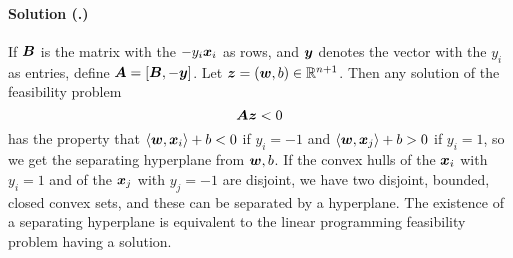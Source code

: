 \documentclass{article}
\newcounter{problemSheetNumber}
\newcounter{problems}
\renewcommand{\solution}[1]{\paragraph{Solution (\theproblemSheetNumber.\theproblems)}\addtocounter{problems}{1}\label{#1}}
\begin{document}
\solution{pr:3} If $\bm{B}$ is the matrix with the $-y_i\bm{x}_i$ as rows, and $\bm{y}$ denotes the vector with the $y_i$ as entries, define $\bm{A}=[\bm{B},-\bm{y}]$. 
Let $\bm{z}=(\bm{w},b)\in \mathbb{R}^{n+1}$. 
Then any solution of the feasibility problem
\begin{equation*}
\bm{A}\bm{z}<0
\end{equation*}
has the property that $\langle {\bm{w}}, {\bm{x}_i} \rangle+b<0$ if $y_i=-1$ and $\langle {\bm{w}}, {\bm{x}_j} \rangle+b>0$ if $y_i=1$, so we get the separating hyperplane from $\bm{w},b$. If the convex hulls of the $\bm{x}_i$ with $y_i=1$ and of the $\bm{x}_j$ with $y_j=-1$ are disjoint, we have two disjoint, bounded, closed convex sets, and these can be separated by a hyperplane. The existence of a separating hyperplane is equivalent to the linear programming feasibility problem having a solution. 

\end{document}
